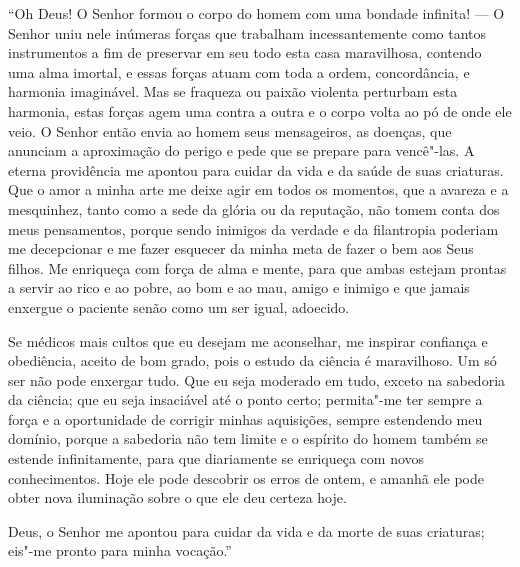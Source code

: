 ``Oh Deus! O Senhor formou o corpo do homem com uma bondade infinita!
--- O Senhor uniu nele inúmeras forças que trabalham incessantemente
como tantos instrumentos a fim de preservar em seu todo esta casa
maravilhosa, contendo uma alma imortal, e essas forças atuam com toda a
ordem, concordância, e harmonia imaginável. Mas se fraqueza ou paixão
violenta perturbam esta harmonia, estas forças agem uma contra a outra
e o corpo volta ao pó de onde ele veio. O Senhor então envia ao homem
seus mensageiros, as doenças, que anunciam a aproximação do perigo e
pede que se prepare para vencê"-las. A eterna providência me apontou para
cuidar da vida e da saúde de suas criaturas. Que o amor a minha arte me
deixe agir em todos os momentos, que a avareza e a mesquinhez, tanto
como a sede da glória ou da reputação, não tomem conta dos meus
pensamentos, porque sendo inimigos da verdade e da filantropia poderiam
me decepcionar e me fazer esquecer da minha meta de fazer o bem aos Seus
filhos. Me enriqueça com força de alma e mente, para que ambas estejam
prontas a servir ao rico e ao pobre, ao bom e ao mau, amigo e inimigo e
que jamais enxergue o paciente senão como um ser igual, adoecido.

Se médicos mais cultos que eu desejam me aconselhar, me inspirar
confiança e obediência, aceito de bom grado, pois o estudo da ciência é
maravilhoso. Um só ser não pode enxergar tudo. Que eu seja moderado em
tudo, exceto na sabedoria da ciência; que eu seja insaciável até o ponto
certo; permita"-me ter sempre a força e a oportunidade de corrigir
minhas aquisições, sempre estendendo meu domínio, porque a sabedoria
não tem limite e o espírito do homem também se estende infinitamente,
para que diariamente se enriqueça com novos conhecimentos. Hoje ele
pode descobrir os erros de ontem, e amanhã ele pode obter nova
iluminação sobre o que ele deu certeza hoje.

Deus, o Senhor me apontou para cuidar da vida e da morte de suas
criaturas; eis"-me pronto para minha vocação.''

